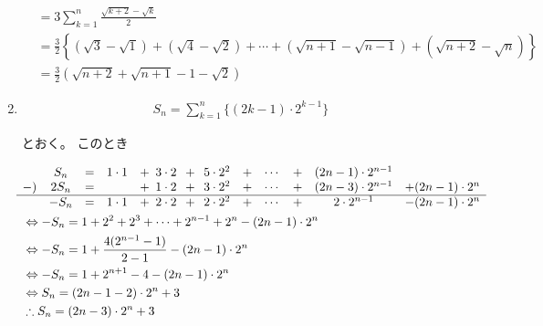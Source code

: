 \documentclass[autodetect-engine,ja=standard, 10.5pt, a4paper, titlepage]{bxjsarticle}
\begin{document}
\begin{enumerate}[1.]
\begin{fleqn}[20pt]
\begin{align*}
        &= 3 \sum_{k=1}^{n}\frac{\sqrt{k+2}-\sqrt{k}}{2} \\
        &= \frac{3}{2}\left\{
          \left(\sqrt{3}-\sqrt{1}\right)
          + \left(\sqrt{4}-\sqrt{2}\right)
          + \cdots
          + \left(\sqrt{n+1}-\sqrt{n-1}\right)
          + \left(\sqrt{n+2}-\sqrt{n}\right)
        \right\} \\
        &= \frac{3}{2}\left( \sqrt{n+2} + \sqrt{n+1} - 1 - \sqrt{2} \right)
      \end{align*}
    \end{fleqn}
  \item
    \begin{fleqn}[20pt]
      \begin{align*}
        S_n = \sum_{k=1}^{n}\{(2k-1)\cdot 2^{k-1}\}
      \end{align*}
    \end{fleqn}
    とおく。
    このとき
      \begin{fleqn}[20pt]
        \begin{align*}
          &\begin{matrix}
            & S_n  & = & 1\cdot1 & + \hspace*{5pt} 3\cdot2 \hspace*{5pt} + \hspace*{5pt} 5\cdot2^2 &+& \cdots &+& (2n-1)\cdot2^{n-1} &                  \\
         -) & 2S_n & = &         & + \hspace*{5pt} 1\cdot2 \hspace*{5pt} + \hspace*{5pt} 3\cdot2^2 &+& \cdots &+& (2n-3)\cdot2^{n-1} & + (2n-1)\cdot2^n \\
         \hline
            & -S_n & = & 1\cdot1 & + \hspace*{5pt} 2\cdot2 \hspace*{5pt} + \hspace*{5pt} 2\cdot2^2 &+& \cdots &+& 2\cdot2^{n-1}      & - (2n-1)\cdot2^n \\
           \end{matrix} \\
           &\Leftrightarrow -S_n = 1 + 2^2 + 2^3 + \cdots + 2^{n-1} + 2^n - (2n-1)\cdot2^n \\
           &\Leftrightarrow -S_n = 1 + \frac{4(2^{n-1}-1)}{2-1} - (2n-1)\cdot2^n \\
           &\Leftrightarrow -S_n = 1 + 2^{n+1} - 4 - (2n-1)\cdot2^n \\
           &\Leftrightarrow  S_n = (2n-1-2)\cdot2^n + 3 \\
           &\therefore S_n = (2n-3)\cdot2^n + 3
        \end{align*}
      \end{fleqn}


\end{enumerate}
\end{document}
